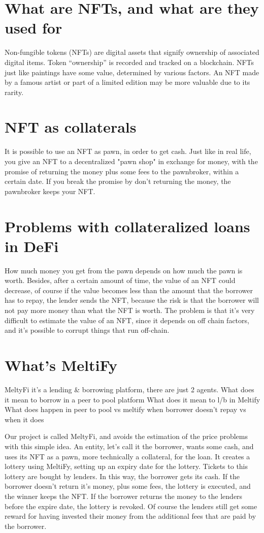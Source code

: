 \section{What are NFTs, and what are they used for}
Non-fungible tokens (NFTs) are digital assets that signify ownership of associated digital items.
Token “ownership” is recorded and tracked on a blockchain.
NFTs just like paintings have some value, determined by various factors. 
An NFT made by a famous artist or part of a limited edition may be more valuable due to its rarity.

\section{NFT as collaterals}
It is possible to use an NFT as pawn, in order to get cash. 
Just like in real life, you give an NFT to a decentralized "pawn shop" in exchange for money,
with the promise of returning the money plus some fees to the pawnbroker, within a certain date.
If you break the promise by don't returning the money, the pawnbroker keeps your NFT. 

\section{Problems with collateralized loans in DeFi}
How much money you get from the pawn depends on how much the pawn is worth.
Besides, after a certain amount of time, the value of an NFT could decrease, of course if the value becomes less than the amount that the borrower has to repay, the lender sends the NFT, because the risk is that the borrower will not pay more money than what the NFT is worth.
The problem is that it's very difficult to estimate the value of an NFT, since it depends on off chain factors, and it's possible to corrupt things that run off-chain.

\section{What's MeltiFy}
MeltyFi it's a lending & borrowing platform, there are just 2 agents. 
What does it mean to borrow in a peer to pool platform 
What does it mean to l/b in Meltify
What does happen in peer to pool vs meltify when borrower doesn't repay vs when it does

Our project is called MeltyFi, and avoids the estimation of the price problems with this simple idea.
An entity, let's call it the borrower, wants some cash, and uses its NFT as a pawn, more technically a collateral, for the loan. 
It creates a lottery using MeltiFy, setting up an expiry date for the lottery. 
Tickets to this lottery are bought by lenders. In this way, the borrower gets its cash. If the borrower doesn't return it's money, plus some fees, the lottery is executed, and the winner keeps the NFT. If the borrower returns the money to the lenders before the expire date, the lottery is revoked. Of course the lenders still get some reward for having invested their money from the additional fees that are paid by the borrower.

